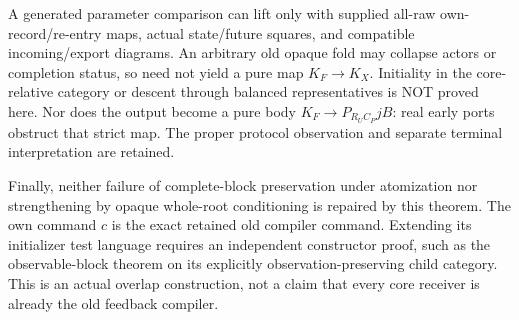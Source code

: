 \documentclass[11pt]{article}
\begin{document}
A generated parameter comparison can lift only with supplied all-raw own-record/re-entry maps, actual state/future squares, and compatible incoming/export diagrams. An arbitrary old opaque fold may collapse actors or completion status, so need not yield a pure map $K_F\to K_X$. Initiality in the core-relative category or descent through balanced representatives is NOT proved here. Nor does the output become a pure body $K_F\to P_{R_U C_P}jB$: real early ports obstruct that strict map. The proper protocol observation and separate terminal interpretation are retained.

Finally, neither failure of complete-block preservation under atomization nor strengthening by opaque whole-root conditioning is repaired by this theorem. The own command $c$ is the exact retained old compiler command. Extending its initializer test language requires an independent constructor proof, such as the observable-block theorem on its explicitly observation-preserving child category. This is an actual overlap construction, not a claim that every core receiver is already the old feedback compiler.
\end{document}
